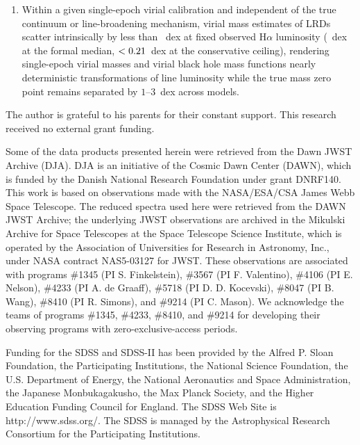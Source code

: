 \documentclass[twocolumn,linenumbers]{aastex701}
\newcommand{\Ha}{H$\alpha$}
\begin{document}
\begin{enumerate}
\item Within a given single-epoch virial calibration and independent of the true continuum or line-broadening mechanism, virial mass estimates of LRDs scatter intrinsically by less than \sigMvir{}~dex at fixed observed \Ha{} luminosity (\sigMvirMed{}~dex at the formal median, $<0.21{}$~dex at the conservative ceiling), rendering single-epoch virial masses and virial black hole mass functions nearly deterministic transformations of line luminosity while the true mass zero point remains separated by $1$--$3$~dex across models.
\end{enumerate}

\begin{acknowledgments}
The author is grateful to his parents for their constant support. This research received no external grant funding.

Some of the data products presented herein were retrieved from the Dawn JWST Archive (DJA). DJA is an initiative of the Cosmic Dawn Center (DAWN), which is funded by the Danish National Research Foundation under grant DNRF140.
This work is based on observations made with the NASA/ESA/CSA James Webb Space Telescope. The reduced spectra used here were retrieved from the DAWN JWST Archive; the underlying JWST observations are archived in the Mikulski Archive for Space Telescopes at the Space Telescope Science Institute, which is operated by the Association of Universities for Research in Astronomy, Inc., under NASA contract NAS5-03127 for JWST. These observations are associated with programs \#1345 (PI S. Finkelstein), \#3567 (PI F. Valentino), \#4106 (PI E. Nelson), \#4233 (PI A. de Graaff), \#5718 (PI D. D. Kocevski), \#8047 (PI B. Wang), \#8410 (PI R. Simons), and \#9214 (PI C. Mason). We acknowledge the teams of programs \#1345, \#4233, \#8410, and \#9214 for developing their observing programs with zero-exclusive-access periods.

Funding for the SDSS and SDSS-II has been provided by the Alfred P. Sloan Foundation, the Participating Institutions, the National Science Foundation, the U.S. Department of Energy, the National Aeronautics and Space Administration, the Japanese Monbukagakusho, the Max Planck Society, and the Higher Education Funding Council for England. The SDSS Web Site is http://www.sdss.org/. The SDSS is managed by the Astrophysical Research Consortium for the Participating Institutions.


\end{acknowledgments}
\end{document}
